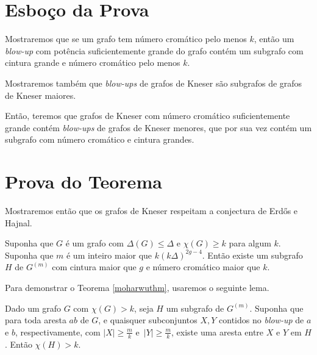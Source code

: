 \section{Esboço da Prova}

Mostraremos que se um grafo tem número cromático pelo menos $k$, então um \textit{blow-up} com potência suficientemente grande do grafo contém um subgrafo com cintura grande e número cromático pelo menos $k$.

Mostraremos também que \textit{blow-ups} de grafos de Kneser são subgrafos de grafos de Kneser maiores.

Então, teremos que grafos de Kneser com número cromático suficientemente grande contém \textit{blow-ups} de grafos de Kneser menores, que por sua vez contém um subgrafo com número cromático e cintura grandes.

\section{Prova do Teorema}

Mostraremos então que os grafos de Kneser respeitam a conjectura de Erd\H{o}s e Hajnal.

\begin{teorema}\label{moharwuthm}
Suponha que $G$ é um grafo com $\Delta(G) \leq \Delta$ e $\chi(G) \geq k$ para algum $k$. Suponha que $m$ é um inteiro maior que $k(k\Delta)^{2g-4}$. Então existe um subgrafo $H$ de $G^{(m)}$ com cintura maior que $g$ e número cromático maior que $k$.
\end{teorema}

Para demonstrar o Teorema \ref{moharwuthm}, usaremos o seguinte lema.

\begin{lema}\label{lemma1kg}
Dado um grafo $G$ com $\chi(G) > k$, seja $H$ um subgrafo de $G^{(m)}$. Suponha que para toda aresta $ab$ de $G$, e quaisquer subconjuntos $X,Y$ contidos no \textit{blow-up} de $a$ e $b$, respectivamente, com $|X| \geq \frac{m}{k}$ e~$|Y| \geq \frac{m}{k}$, existe uma aresta entre $X$ e $Y$ em $H$. Então $\chi(H) > k$.
\end{lema}

